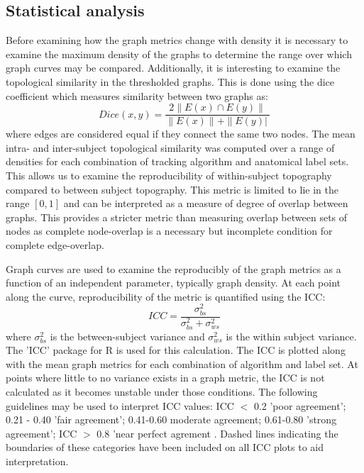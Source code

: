 \documentclass{frontiersSCNS} %
\newcommand{\R}{R}
\begin{document}
\subsection{Statistical analysis}
Before examining how the graph metrics change with density it is necessary to examine the maximum density of the graphs to determine the range over which graph curves may be compared. Additionally, it is interesting to examine the topological similarity in the thresholded graphs. This is done using the dice coefficient which measures similarity between two graphs as:
$$Dice(x,y) = \frac{ 2 \| E(x) \cap E(y) \| }{ \|E(x) \| + \| E(y) |\ }$$
where edges are considered equal if they connect the same two nodes. The mean intra- and inter-subject topological similarity 
was computed over a range of densities for each combination of tracking algorithm and anatomical label sets. This allows us to 
examine the reproducibility of within-subject topography compared to between subject topography. This metric is limited to lie in the range $[0,1]$ and can be interpreted as a measure of degree of overlap between graphs. This provides a stricter metric than measuring overlap between sets of nodes as complete node-overlap is a necessary but incomplete condition for complete edge-overlap.

Graph curves are used to examine the reproducibly of the graph metrics as a function of an independent parameter, typically graph density. At each point along the curve, reproducibility of the metric is quantified using the ICC:
$$ICC = \frac{\sigma_{bs}^{2}}{\sigma_{bs}^{2} + \sigma_{ws}^{2}} $$
where $\sigma_{bs}^{2}$ is the between-subject variance and $\sigma_{ws}^{2}$ is the within subject variance. The 'ICC' package for  \R{} is used for this calculation. The ICC is plotted along with the mean graph metrics for each combination of algorithm and label set. At points where little to no variance exists in a graph metric, the ICC is not calculated as it becomes unstable under those conditions. The following guidelines may be used to interpret ICC values: ICC $<$ 0.2 'poor agreement'; 0.21 - 0.40 'fair agreement'; 0.41-0.60 moderate agreement; 0.61-0.80 'strong agreement'; ICC $>$ 0.8 'near perfect agrement \citep{Telesford2010,Montgomery2002}. Dashed lines indicating the boundaries of these categories have been included on all ICC plots to aid interpretation.
\end{document}
